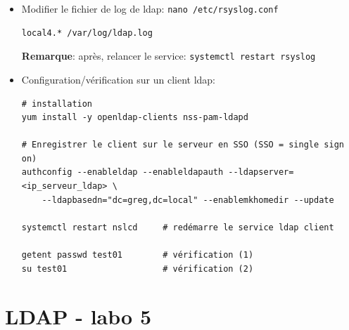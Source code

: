 \documentclass[a4paper]{article}
\begin{document}
\begin{itemize}
\item Modifier le fichier de log de ldap: \texttt{nano /etc/rsyslog.conf}
\begin{example} \begin{verbatim}
local4.* /var/log/ldap.log
\end{verbatim} \end{example}
\textbf{Remarque}: après, relancer le service: \texttt{systemctl restart rsyslog}


\item Configuration/vérification sur un client ldap:
\begin{example} \begin{verbatim}
# installation
yum install -y openldap-clients nss-pam-ldapd

# Enregistrer le client sur le serveur en SSO (SSO = single sign on)
authconfig --enableldap --enableldapauth --ldapserver=<ip_serveur_ldap> \
    --ldapbasedn="dc=greg,dc=local" --enablemkhomedir --update

systemctl restart nslcd     # redémarre le service ldap client

getent passwd test01        # vérification (1)
su test01                   # vérification (2)
\end{verbatim} \end{example}


\end{itemize}
















\newpage \section{LDAP - labo 5}
\end{document}
